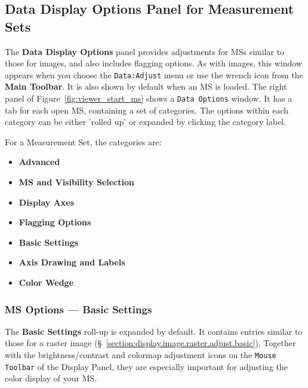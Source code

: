  


\subsection{Data Display Options Panel for Measurement Sets}
\label{section:display.ms.adjust}

The {\bf Data Display Options} panel provides adjustments for MSs
similar to those for images, and also includes flagging options.
As with images, this window appears when you choose the {\tt Data:Adjust}
menu or use the wrench icon from the {\bf Main Toolbar}. It is also shown
by default when an MS is loaded. The right panel
of Figure~\ref{fig:viewer_start_ms} shows a {\tt Data Options} window. 
It has a tab for each open MS, containing a set of categories.  The
options within each category can be either 'rolled up' or expanded by
clicking the category label.

For a Measurement Set, the categories are:
\begin{itemize}
   \item {\bf Advanced}
   \item {\bf MS and Visibility Selection}
   \item {\bf Display Axes}
   \item {\bf Flagging Options}
   \item {\bf Basic Settings}
   \item {\bf Axis Drawing and Labels}
   \item {\bf Color Wedge}
\end{itemize}


\subsubsection{MS Options --- Basic Settings}
\label{section:display.ms.adjust.basic}

The {\bf Basic Settings} roll-up is expanded by
default.  It contains entries similar to
those for a raster image (\S~\ref{section:display.image.raster.adjust.basic}). 
Together with the brightness/contrast and colormap adjustment icons
on the {\tt Mouse Toolbar} of the Display Panel, they are especially
important for adjusting the color display of your MS.

